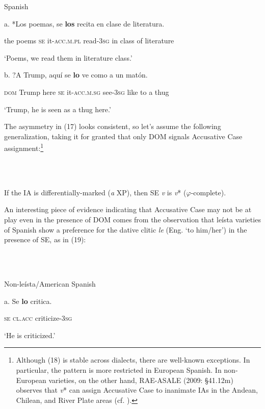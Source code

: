 \documentclass[output=paper]{langsci/langscibook}
\begin{document}
           Spanish

a.   *Los poemas, se   \textbf{los}                recita        en clase de literatura.            

          the  poems   \textsc{se} it\textsc{{}-acc}.\textsc{m.pl} read\textsc{{}-3}\textsc{sg}  in  class of literature

          ‘Poems, we read them in literature class.’         

b.   ?A        Trump,  aquí  se   \textbf{lo}                   ve           como a   un matón.   

         \textsc{dom} Trump   here  \textsc{se} it\textsc{{}-acc}.\textsc{m.sg} see\textsc{{}-3}\textsc{sg} like    to  a    thug

         ‘Trump, he is seen as a thug here.’ 

The asymmetry in (17) looks consistent, so let’s assume the following generalization, taking it for granted that only DOM signals Accusative Case assignment:\footnote{Although (18) is stable across dialects, there are well-known exceptions. In particular, the pattern is more restricted in European Spanish. In non-European varieties, on the other hand, RAE-ASALE (2009: §41.12m) observes that \textit{v}* can assign Accusative Case to inanimate IAs in the Andean, Chilean, and River Plate areas (cf. \citealt{Gallego2016}).}

\ea%
    \label{ex:key:18}
    \gll\\
        \\
    \glt
    \z

          If the IA is differentially-marked (\textit{a} XP), then SE \textit{v} is \textit{v}* ($\varphi $-complete).

An interesting piece of evidence indicating that Accusative Case may not be at play even in the presence of DOM comes from the observation that leísta varieties of Spanish show a preference for the dative clitic \textit{le} (Eng. ‘to him/her’) in the presence of SE, as in (19):

\ea%
    \label{ex:key:19}
    \gll\\
        \\
    \glt
    \z

          Non-leísta/American Spanish

a.   Se  \textbf{lo}       critica.          

        \textsc{se  cl.acc} criticize\textsc{{}-3}\textsc{sg}

     ‘He is criticized.’
\end{document}

